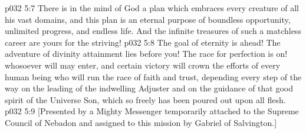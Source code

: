 \pc \vs p032 5:7 There is in the mind of God a plan which embraces every creature of all his vast domains, and this plan is an eternal purpose of boundless opportunity, unlimited progress, and endless life. And the infinite treasures of such a matchless career are yours for the striving!
\vs p032 5:8 The goal of eternity is ahead! The adventure of divinity attainment lies before you! The race for perfection is on! whosoever will may enter, and certain victory will crown the efforts of every human being who will run the race of faith and trust, depending every step of the way on the leading of the indwelling Adjuster and on the guidance of that good spirit of the Universe Son, which so freely has been poured out upon all flesh.
\vsetoff
\vs p032 5:9 [Presented by a Mighty Messenger temporarily attached to the Supreme Council of Nebadon and assigned to this mission by Gabriel of Salvington.]
